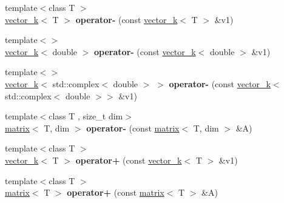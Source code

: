 \begin{DoxyCompactItemize}
\item 
\hypertarget{namespacekeycpp_a8afc5fb1383ec8d667f52ac3778df34c}{{\footnotesize template$<$class T $>$ }\\\hyperlink{classkeycpp_1_1vector__k}{vector\-\_\-k}$<$ T $>$ {\bfseries operator-\/} (const \hyperlink{classkeycpp_1_1vector__k}{vector\-\_\-k}$<$ T $>$ \&v1)}\label{namespacekeycpp_a8afc5fb1383ec8d667f52ac3778df34c}

\item 
\hypertarget{namespacekeycpp_a18d99849477754b35d0a3187ceb60508}{{\footnotesize template$<$$>$ }\\\hyperlink{classkeycpp_1_1vector__k}{vector\-\_\-k}$<$ double $>$ {\bfseries operator-\/} (const \hyperlink{classkeycpp_1_1vector__k}{vector\-\_\-k}$<$ double $>$ \&v1)}\label{namespacekeycpp_a18d99849477754b35d0a3187ceb60508}

\item 
\hypertarget{namespacekeycpp_a77245a0566dc6436443ad15187512ef0}{{\footnotesize template$<$$>$ }\\\hyperlink{classkeycpp_1_1vector__k}{vector\-\_\-k}$<$ std\-::complex$<$ double $>$ $>$ {\bfseries operator-\/} (const \hyperlink{classkeycpp_1_1vector__k}{vector\-\_\-k}$<$ std\-::complex$<$ double $>$$>$ \&v1)}\label{namespacekeycpp_a77245a0566dc6436443ad15187512ef0}

\item 
\hypertarget{namespacekeycpp_ac6b0a62473683f833921698fbf6f5ed2}{{\footnotesize template$<$class T , size\-\_\-t dim$>$ }\\\hyperlink{classkeycpp_1_1matrix}{matrix}$<$ T, dim $>$ {\bfseries operator-\/} (const \hyperlink{classkeycpp_1_1matrix}{matrix}$<$ T, dim $>$ \&A)}\label{namespacekeycpp_ac6b0a62473683f833921698fbf6f5ed2}

\item 
\hypertarget{namespacekeycpp_a5daa1c95786fd3745687914963e7229e}{{\footnotesize template$<$class T $>$ }\\\hyperlink{classkeycpp_1_1vector__k}{vector\-\_\-k}$<$ T $>$ {\bfseries operator+} (const \hyperlink{classkeycpp_1_1vector__k}{vector\-\_\-k}$<$ T $>$ \&v1)}\label{namespacekeycpp_a5daa1c95786fd3745687914963e7229e}

\item 
\hypertarget{namespacekeycpp_a5b10f703c72875b9f5e2ecc5c7696f9c}{{\footnotesize template$<$class T $>$ }\\\hyperlink{classkeycpp_1_1matrix}{matrix}$<$ T $>$ {\bfseries operator+} (const \hyperlink{classkeycpp_1_1matrix}{matrix}$<$ T $>$ \&A)}\label{namespacekeycpp_a5b10f703c72875b9f5e2ecc5c7696f9c}


\end{DoxyCompactItemize}
